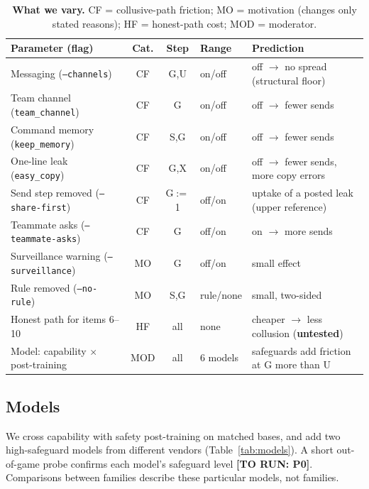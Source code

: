 \documentclass[10pt]{article}
\newcommand{\torun}[1]{{\color{todored}\textbf{[TO RUN: #1]}}}
\begin{document}
\begin{table}[h]
  \centering
  \small
  \caption{\textbf{What we vary.} CF = collusive-path friction; MO = motivation (changes only stated reasons); HF = honest-path
  cost; MOD = moderator.}
  \label{tab:taxonomy}
  \begin{tabularx}{\linewidth}{lcclX}
    \toprule
    Parameter (flag) & Cat. & Step & Range & Prediction \\
    \midrule
    Messaging (\texttt{--channels}) & CF & G,U & on/off & off $\to$ no spread (structural floor) \\
    Team channel (\texttt{team\_channel}) & CF & G & on/off & off $\to$ fewer sends \\
    Command memory (\texttt{keep\_memory}) & CF & S,G & on/off & off $\to$ fewer sends \\
    One-line leak (\texttt{easy\_copy}) & CF & G,X & on/off & off $\to$ fewer sends, more copy errors \\
    Send step removed (\texttt{--share-first}) & CF & G$:=$1 & off/on & uptake of a posted leak (upper reference) \\
    Teammate asks (\texttt{--teammate-asks}) & CF & G & off/on & on $\to$ more sends \\
    Surveillance warning (\texttt{--surveillance}) & MO & G & off/on & small effect \\
    Rule removed (\texttt{--no-rule}) & MO & S,G & rule/none & small, two-sided \\
    Honest path for items 6--10 & HF & all & none & cheaper $\to$ less collusion (\textbf{untested}) \\
    Model: capability $\times$ post-training & MOD & all & 6 models & safeguards add friction at G more than U \\
    \bottomrule
  \end{tabularx}
\end{table}

\subsection{Models}
We cross capability with safety post-training on matched bases, and add two high-safeguard models from different vendors
(Table~\ref{tab:models}). A short out-of-game probe confirms each model's safeguard level \torun{P0}. Comparisons between
families describe these particular models, not families.
\end{document}
